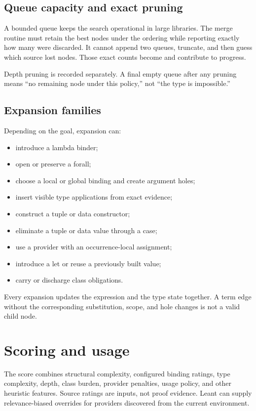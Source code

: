 \documentclass[10pt,letterpaper,oneside]{report}
\newcommand{\code}[1]{\texttt{\detokenize{#1}}}
\begin{document}
\subsection{Queue capacity and exact pruning}

A bounded queue keeps the search operational in large libraries. The merge routine must retain the best nodes under the ordering while reporting exactly how many were discarded. It cannot append two queues, truncate, and then guess which source lost nodes. Those exact counts become \code{QueueLimitPruned} and contribute to progress.

Depth pruning is recorded separately. A final empty queue after any pruning means ``no remaining node under this policy,'' not ``the type is impossible.''

\subsection{Expansion families}

Depending on the goal, expansion can:

\begin{itemize}
  \item introduce a lambda binder;
  \item open or preserve a forall;
  \item choose a local or global binding and create argument holes;
  \item insert visible type applications from exact evidence;
  \item construct a tuple or data constructor;
  \item eliminate a tuple or data value through a case;
  \item use a provider with an occurrence-local assignment;
  \item introduce a let or reuse a previously built value;
  \item carry or discharge class obligations.
\end{itemize}

Every expansion updates the expression and the type state together. A term edge without the corresponding substitution, scope, and hole changes is not a valid child node.

\section{Scoring and usage}

The score combines structural complexity, configured binding ratings, type complexity, depth, class burden, provider penalties, usage policy, and other heuristic features. Source ratings are inputs, not proof evidence. Leant can supply relevance-biased overrides for providers discovered from the current environment.
\end{document}

